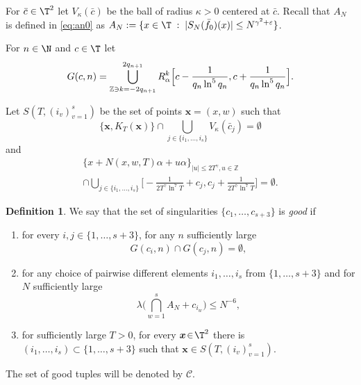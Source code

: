 \documentclass[10pt]{amsart}
\let\DS\relax
\newcommand\cC{\mathcal{C}}
\newcommand\cG{\mathcal{G}}
\newcommand\Z{\mathbb{Z}}
\newcommand\bx{\boldsymbol{x}}
\let\eps\varepsilon
\theoremstyle{definition}
\newtheorem{definition}{Definition}
\theoremstyle{plain}
\begin{document}
For $\bar{c}\in \T^2$ let $V_\kappa (\bar{c})$ be the ball of radius $\kappa>0$ centered at $\bar{c}$.
Recall that $A_N$ is defined in \eqref{eq:an0} as
$
\DS A_N:=\{x\in \T\;:\; |S_N(\bar{f}_0)(x)|\leq N^{\gamma^2+\eps}\}$.

For $n\in \N$ and $c\in \T$ let
\begin{equation}\label{eq:gcn}
G(c,n)= \bigcup_{\Z\ni k=-2q_{n+1}}^{2q_{n+1}}
R^k_\alpha\Bigl[c-\frac{1}{q_n\ln^{5}q_n}, c+\frac{1}{q_n\ln^{5}q_n}\Bigr].
\end{equation}

Let $S(T,(i_v)_{v=1}^s)$ be the set of points $\bx=(x, w)$ such that
\begin{equation}\label{eq:awaysing}
\{\bx, K_T(\bx)\}\cap \bigcup_{j\in \{i_1,\ldots,{i_s}\} }V_\kappa(\bar{c}_j)
{=\emptyset}
\end{equation}
and
\begin{multline}\label{eq:awaysing2}
\{x+N(x,w,T)\alpha+u\alpha\}_{|u|\leq 2T^\gamma, u\in \Z} \\
\cap
\bigcup_{j\in \{i_1,\ldots,{ i_s}\}} \Big[-\frac{1}{2T^\gamma\ln^{7}T}+ c_j, c_j+\frac{1}{2T^\gamma\ln^{7}T}\Big]
=\emptyset.
\end{multline}

\begin{definition} \label{def.good}
We say that the set of singularities $\{c_1,\ldots,c_{s+3}\}$ is {\it good} if
\begin{enumerate}\renewcommand{\theenumi}{$\cG$\arabic{enumi}}
\item\label{cG1}
for every $i,j \in \{1,\ldots, s+3\}$, for any $n$ sufficiently large
\[
G(c_i,n)\cap G(c_j,n)=\emptyset,
\]

\item\label{cG2}
for any choice of pairwise different elements $i_1,\ldots,i_s$ from $\{1,\ldots,s+3\}$ and for $N$ sufficiently large
\[
\lambda\Big(\bigcap_{w=1}^sA_N+c_{i_w}\Big)\leq N^{-6},
\]

\item\label{cG3}
for sufficiently large $T\!>\!0$, for every $\bx\!\in\! \T^2$ there is \hbox{$(i_1,\ldots,i_s)\!\subset\! \{1,\ldots,s+3\}$} such that $ \bx\in S(T,(i_v)_{v=1}^s)$.
\end{enumerate}
The set of good tuples will be denoted by $\cC$.
\end{definition}
\end{document}
